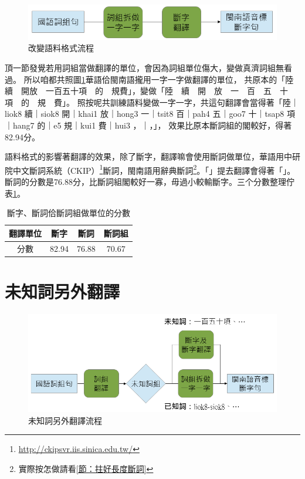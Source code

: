 \documentclass[final,oneside,onecolumn,12pt,a4paper]{book}%
\begin{document}
\begin{figure}
\centerline{\includegraphics[keepaspectratio,width=40em]{圖/改變語料格式}}
\caption{改變語料格式流程}
\label{改變語料格式}
\end{figure}

頂一節發覺若用詞組當做翻譯的單位，會因為詞組單位傷大，變做真濟詞組無看過。
所以咱都共照圖\ref{改變語料格式}華語佮閩南語攏用一字一字做翻譯的單位，
共原本的「陸續　開放　一百五十項　的　規費」，變做「陸　續　開　放　一　百　五　十　項　的　規　費」。
照按呢共訓練語料變做一字一字，共這句翻譯會當得著「陸｜liok8 續｜siok8 開｜khai1 放｜hong3 一｜tsit8 百｜pah4 五｜goo7 十｜tsap8 項｜hang7 的｜e5 規｜kui1 費｜hui3 ，｜，」，
效果比原本斷詞組的閣較好，得著82.94分。

語料格式的影響著翻譯的效果，除了斷字，翻譯嘛會使用斷詞做單位，華語用中研院中文斷詞系統（CKIP）\footnote{\url{http://ckipsvr.iis.sinica.edu.tw/}}斷詞，閩南語用辭典斷詞\footnote{實際按怎做請看\ref{節：拄好長度斷詞}}。「」提去翻譯會得著「」。斷詞的分數是76.88分，比斷詞組閣較好一寡，毋過小較輸斷字。三个分數整理佇表\ref{表：斷詞組、斷詞、斷字做單位的翻譯分數}。

\begin{table}
\caption{斷字、斷詞佮斷詞組做單位的分數}%
\label{表：斷詞組、斷詞、斷字做單位的翻譯分數}
\centering
\begin{tabular}{c|ccc}
翻譯單位 & 斷字 & 斷詞 & 斷詞組\\
\hline
分數　& 82.94 & 76.88 & 70.67\\
\end{tabular}
\end{table}

\section{未知詞另外翻譯}
\label{節：未知詞另外翻譯}

\begin{figure}
\centerline{\includegraphics[keepaspectratio,width=40em]{圖/未知詞另外翻譯}}
\caption{未知詞另外翻譯流程}
\label{未知詞另外翻譯}
\end{figure}
\end{document}
